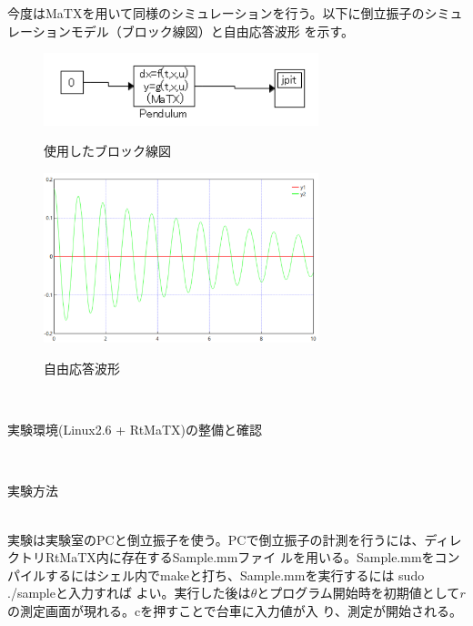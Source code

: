 \documentclass{jarticle}
\begin{document}
\begin{enumerate}
\begin{enumerate}
\begin{enumerate}
					今度はMaTXを用いて同様のシミュレーションを行う。以下に倒立振子のシミュレーションモデル（ブロック線図）と自由応答波形
					を示す。\\
					\begin{figure}[htbp]
					\begin{center}
						\includegraphics[width=8cm]{gazo/BlockNonLinerM.pdf}\\
					\end{center}
					\caption{使用したブロック線図}
					\end{figure}
					\begin{figure}[htbp]
					\begin{center}
						\includegraphics[width=8cm]{gazo/FreePendulumSimulationJAMOXM.pdf}\\
					\end{center}
					\caption{自由応答波形}
					\end{figure}
				
			\end{enumerate}
		\end{enumerate}	

		{\LARGE\item {}}\\ 
		\begin{enumerate}
			{\Large\item 実験環境(Linux2.6 + RtMaTX)の整備と確認}\\
			\begin{enumerate}
				{\large\item 実験方法}\\
				
					実験は実験室のPCと倒立振子を使う。PCで倒立振子の計測を行うには、ディレクトリRtMaTX内に存在するSample.mmファイ
					ルを用いる。Sample.mmをコンパイルするにはシェル内でmakeと打ち、Sample.mmを実行するには sudo ./sampleと入力すれば
					よい。実行した後は$\theta$とプログラム開始時を初期値として$r$の測定画面が現れる。cを押すことで台車に入力値が入
					り、測定が開始される。\\
					

\end{enumerate}
\end{enumerate}
\end{enumerate}
\end{document}
